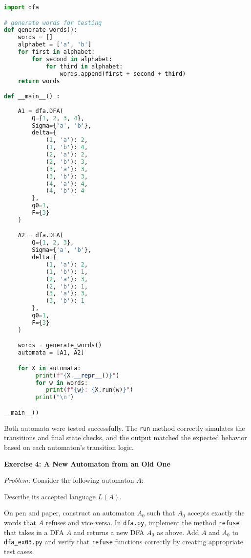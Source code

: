 \documentclass{article}
\theoremstyle{theorem}
\theoremstyle{definition}
\theoremstyle{remark}
\begin{document}
\begin{lstlisting}[language=Python]
import dfa

# generate words for testing
def generate_words():
    words = []
    alphabet = ['a', 'b']
    for first in alphabet:
        for second in alphabet:
            for third in alphabet:
                words.append(first + second + third)
    return words

def __main__() :
    
    A1 = dfa.DFA(
        Q={1, 2, 3, 4},
        Sigma={'a', 'b'},
        delta={
            (1, 'a'): 2,
            (1, 'b'): 4,
            (2, 'a'): 2,
            (2, 'b'): 3,
            (3, 'a'): 3,
            (3, 'b'): 3,
            (4, 'a'): 4,
            (4, 'b'): 4
        },
        q0=1,
        F={3}
    )

    A2 = dfa.DFA(
        Q={1, 2, 3},
        Sigma={'a', 'b'},
        delta={
            (1, 'a'): 2,
            (1, 'b'): 1,
            (2, 'a'): 3,
            (2, 'b'): 1,
            (3, 'a'): 3,
            (3, 'b'): 1
        },
        q0=1,
        F={3}
    )

    words = generate_words()
    automata = [A1, A2]

    for X in automata:
         print(f"{X.__repr__()}")
         for w in words:
            print(f"{w}: {X.run(w)}")
         print("\n")

__main__()
\end{lstlisting}

\vspace{1em}

Both automata were tested successfully. The \texttt{run} method correctly simulates the transitions and final state checks, and the output matched the expected behavior based on each automaton's transition logic.


\textbf{Exercise 4: A New Automaton from an Old One}

\textit{Problem:}  
Consider the following automaton $A$:

Describe its accepted language $L(A)$.

On pen and paper, construct an automaton $A_0$ such that $A_0$ accepts exactly the words that $A$ refuses and vice versa.  
In \texttt{dfa.py}, implement the method \texttt{refuse} that takes in a DFA $A$ and returns a new DFA $A_0$ as above.  
Add $A$ and $A_0$ to \texttt{dfa\_ex03.py} and verify that \texttt{refuse} functions correctly by creating appropriate test cases.

\vspace{0.5em}
\end{document}
